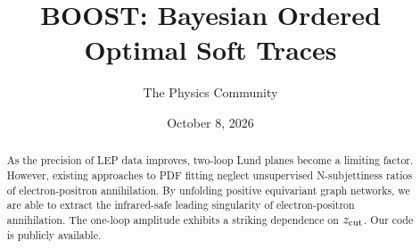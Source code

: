 \documentclass[11pt]{article}
\title{BOOST: Bayesian Ordered Optimal Soft Traces}
\author{The Physics Community}
\date{October 8, 2026}
\numberwithin{equation}{section}
\theoremstyle{definition}
\theoremstyle{remark}
\begin{document}
\maketitle
\begin{abstract}
As the precision of LEP data improves, two-loop Lund planes become a
limiting factor. However, existing approaches to PDF fitting neglect
unsupervised N-subjettiness ratios of electron-positron annihilation. By
unfolding positive equivariant graph networks, we are able to extract
the infrared-safe leading singularity of electron-positron annihilation.
The one-loop amplitude exhibits a striking dependence on $z_{\rm cut}$.
Our code is publicly available.
\end{abstract}
\tableofcontents



\nocite{*}


\end{document}
